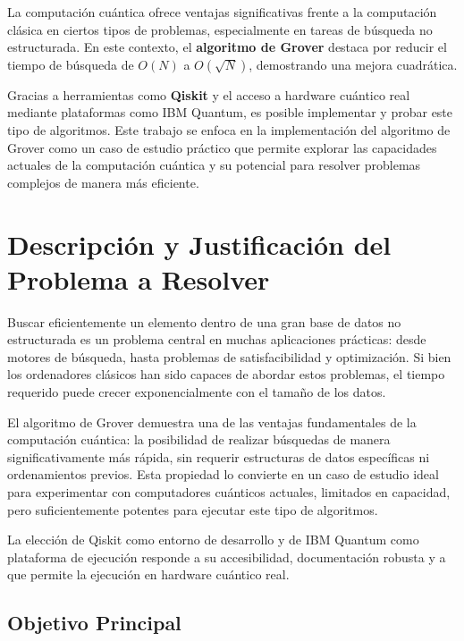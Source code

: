 \documentclass{article}
\begin{document}
La computación cuántica ofrece ventajas significativas frente a la computación clásica en ciertos tipos de problemas, especialmente en tareas de búsqueda no estructurada. En este contexto, el \textbf{algoritmo de Grover} destaca por reducir el tiempo de búsqueda de $O(N)$ a $O(\sqrt{N})$, demostrando una mejora cuadrática.

Gracias a herramientas como \textbf{Qiskit} y el acceso a hardware cuántico real mediante plataformas como IBM Quantum, es posible implementar y probar este tipo de algoritmos. Este trabajo se enfoca en la implementación del algoritmo de Grover como un caso de estudio práctico que permite explorar las capacidades actuales de la computación cuántica y su potencial para resolver problemas complejos de manera más eficiente.



\section{Descripción y Justificación del Problema a Resolver}\label{sec:descr}

Buscar eficientemente un elemento dentro de una gran base de datos no estructurada es un problema central en muchas aplicaciones prácticas: desde motores de búsqueda, hasta problemas de satisfacibilidad y optimización. Si bien los ordenadores clásicos han sido capaces de abordar estos problemas, el tiempo requerido puede crecer exponencialmente con el tamaño de los datos.

El algoritmo de Grover demuestra una de las ventajas fundamentales de la computación cuántica: la posibilidad de realizar búsquedas de manera significativamente más rápida, sin requerir estructuras de datos específicas ni ordenamientos previos. Esta propiedad lo convierte en un caso de estudio ideal para experimentar con computadores cuánticos actuales, limitados en capacidad, pero suficientemente potentes para ejecutar este tipo de algoritmos.

La elección de Qiskit como entorno de desarrollo y de IBM Quantum como plataforma de ejecución responde a su accesibilidad, documentación robusta y a que permite la ejecución en hardware cuántico real.

\subsection{Objetivo Principal}
\end{document}
